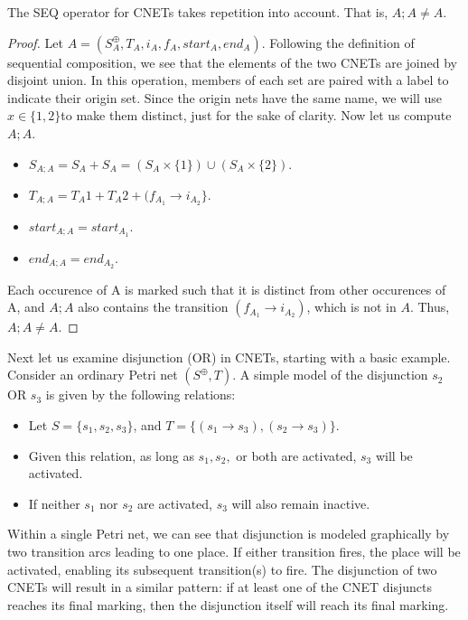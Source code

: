 \begin{lemma}
\label{lemma:SEQ:REP}
The SEQ operator for CNETs takes repetition into account. That is, $A;A \neq A$.
\end{lemma}
\begin{proof}
Let $A = (S_A^\oplus, T_A, i_A, f_A, start_A, end_A)$. 
Following the definition of sequential composition, we see that the elements of the two CNETs are joined by disjoint union. In this operation, members of each set are paired with a label to indicate their origin set. Since the origin nets have the same name, we will use $x\in \{1,2\}$to make them distinct, just for the sake of clarity. 
Now let us compute $A;A$.
\begin{itemize}
\item $S_{A;A} = S_A + S_A = (S_A \times \{1\}) \cup (S_A \times \{2\}).$
\item $T_{A;A} = T_A1 + T_A2 + (f_{A_1} \to i_{A_2}\}$.
\item $start_{A;A} = start_{A_1}.$
\item $end_{A;A} = end_{A_2}. $
\end{itemize} 
Each occurence of A is marked such that it is distinct from other occurences of A, and $A;A$ also contains the transition $(f_{A_1} \to i_{A_2})$, which is not in $A$.
Thus, $A;A \neq A$.
\end{proof}   
\begin{example}
  \label{ex:OR-PN}
Next let us examine disjunction (OR) in CNETs, starting with a basic example. Consider an ordinary Petri net $(S^\oplus, T)$. A simple model of the disjunction $s_2$ OR $s_3$ is given by the following relations:
  \begin{itemize}
  \item Let $S = \{s_1, s_2, s_3\}$, and $T = \{(s_1 \to s_3), (s_2 \to s_3)\}$. 
  \item Given this relation, as long as $s_1, s_2,$ or both are activated, $s_3$ will be activated. 
  \item If neither $s_1$ nor $s_2$ are activated, $s_3$ will also remain inactive.  
  \end{itemize}
Within a single Petri net, we can see that disjunction is modeled
graphically by two transition arcs leading to one place. If either 
transition fires, the place will be activated, enabling its subsequent
transition(s) to fire. The disjunction of two CNETs will result in a
similar pattern: if at least one of the CNET disjuncts reaches its
final marking, then the disjunction itself will reach its final
marking.
\end{example}

